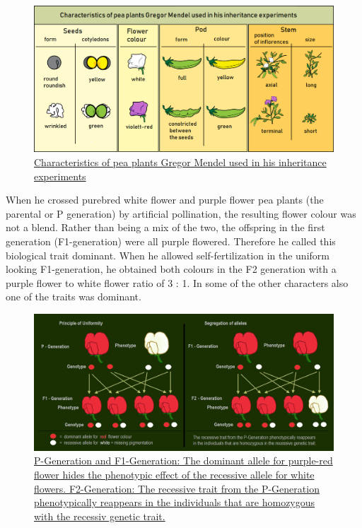 \begin{figure}

{\centering \includegraphics[width=0.7\linewidth]{./figures/mendel/Gregor_Mendel_-_characteristics_of_pea_plants_-_english} 

}

\caption{\href{https://commons.wikimedia.org/wiki/File:Gregor_Mendel_-_characteristics_of_pea_plants_-_english.png}{Characteristics of pea plants Gregor Mendel used in his inheritance experiments}}\label{fig:characteristics}
\end{figure}

When he crossed purebred white flower and purple flower pea plants (the parental or P generation) by artificial pollination, the resulting flower colour was not a blend. Rather than being a mix of the two, the offspring in the first generation (F1-generation) were all purple flowered. Therefore he called this biological trait dominant. When he allowed self-fertilization in the uniform looking F1-generation, he obtained both colours in the F2 generation with a purple flower to white flower ratio of 3 : 1. In some of the other characters also one of the traits was dominant.



\begin{figure}

{\centering \includegraphics[width=0.7\linewidth]{./figures/mendel/Dominant-recessive_inheritance_-_flowers_of_pea_plants} 

}

\caption{\href{https://commons.wikimedia.org/wiki/File:Dominant-recessive_inheritance_-_flowers_of_pea_plants.png}{P-Generation and F1-Generation: The dominant allele for purple-red flower hides the phenotypic effect of the recessive allele for white flowers. F2-Generation: The recessive trait from the P-Generation phenotypically reappears in the individuals that are homozygous with the recessiv genetic trait.}}\label{fig:dominant}
\end{figure}

